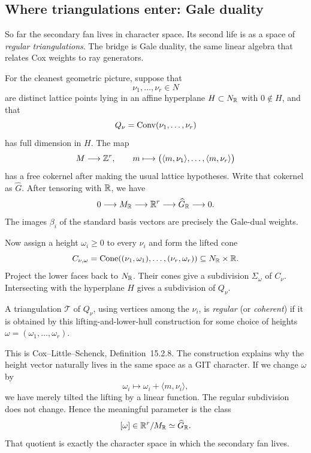\subsection{Where triangulations enter: Gale duality}

So far the secondary fan lives in character space.  Its second life is
as a space of \emph{regular triangulations}.  The bridge is Gale
duality, the same linear algebra that relates Cox weights to ray
generators.

For the cleanest geometric picture, suppose that
\[
\nu_1,\dots,\nu_r\in N
\]
are distinct lattice points lying in an affine hyperplane
\(H\subset N_{\mathbb{R}}\) with \(0\notin H\), and that
\[
Q_\nu=\operatorname{Conv}(\nu_1,\dots,\nu_r)
\]
has full dimension in \(H\).  The map
\[
M\longrightarrow\mathbb{Z}^r,
\qquad
m\longmapsto
\bigl(\langle m,\nu_1\rangle,\dots,
      \langle m,\nu_r\rangle\bigr)
\]
has a free cokernel after making the usual lattice hypotheses.  Write
that cokernel as \(\widehat G\).  After tensoring with \(\mathbb{R}\), we have
\[
0\longrightarrow M_{\mathbb{R}}
\longrightarrow\mathbb{R}^r
\longrightarrow\widehat G_{\mathbb{R}}
\longrightarrow0.
\]
The images \(\beta_i\) of the standard basis vectors are precisely the
Gale-dual weights.

Now assign a height \(\omega_i\geq0\) to every \(\nu_i\) and form the
lifted cone
\[
C_{\nu,\omega}
=
\operatorname{Cone}((\nu_1,\omega_1),\dots,(\nu_r,\omega_r))
\subseteq N_{\mathbb{R}}\times\mathbb{R}.
\]
Project the lower faces back to \(N_{\mathbb{R}}\).  Their cones give a
subdivision \(\Sigma_\omega\) of \(C_\nu\).  Intersecting with the
hyperplane \(H\) gives a subdivision of \(Q_\nu\).

\begin{definition}
A triangulation \(\mathcal T\) of \(Q_\nu\), using vertices among the
\(\nu_i\), is \emph{regular} (or \emph{coherent}) if it is obtained by
this lifting-and-lower-hull construction for some choice of heights
\(\omega=(\omega_1,\dots,\omega_r)\).
\end{definition}

This is Cox--Little--Schenck, Definition~15.2.8.  The construction
explains why the height vector naturally lives in the same space as a
GIT character.  If we change \(\omega\) by
\[
\omega_i
\longmapsto
\omega_i+\langle m,\nu_i\rangle,
\]
we have merely tilted the lifting by a linear function.  The regular
subdivision does not change.  Hence the meaningful parameter is the
class
\[
[\omega]\in
\mathbb{R}^r/M_{\mathbb{R}}
\simeq
\widehat G_{\mathbb{R}}.
\]
That quotient is exactly the character space in which the secondary
fan lives.


